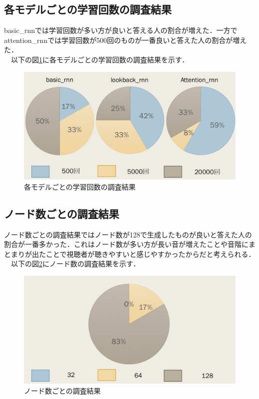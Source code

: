 \subsection{各モデルごとの学習回数の調査結果}
basic\_rnnでは学習回数が多い方が良いと答える人の割合が増えた．一方でattention\_rnnでは学習回数が500回のものが一番良いと答えた人の割合が増えた．\\
　以下の図\ref{fig:各モデルごとの学習回数の調査結果}に各モデルごとの学習回数の調査結果を示す．
\begin{figure}[h]
    \begin{screen}
    \begin{center}
        \includegraphics[scale=0.6, clip]{./img/glaph2.png}
        \caption{各モデルごとの学習回数の調査結果}
        \label{fig:各モデルごとの学習回数の調査結果}
    \end{center}
    \end{screen}
\end{figure}
\newpage
\subsection{ノード数ごとの調査結果}
ノード数ごとの調査結果ではノード数が128で生成したものが良いと答えた人の割合が一番多かった．これはノード数が多い方が長い音が増えたことや音階にまとまりが出たことで視聴者が聴きやすいと感じやすかったからだと考えられる．\\
　以下の図\ref{fig:ノード数の調査結果}にノード数の調査結果を示す．\\
\begin{figure}[h]
    \begin{screen}
    \begin{center}
        \includegraphics[scale=0.6, clip]{./img/glaph3.png}
        \caption{ノード数ごとの調査結果}
        \label{fig:ノード数の調査結果}
    \end{center}
    \end{screen}
\end{figure}
\newpage
\newpage
